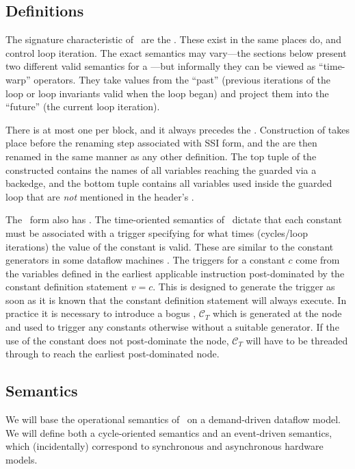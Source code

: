 \documentclass[12pt,titlepage,twoside]{article}
\newcommand{\ignore}[1]{}
\begin{document}
\subsection{Definitions}

The signature characteristic of \ssiplus\ are the .
These  exist in the same places  do, and
control loop iteration.  The exact semantics may vary---the sections
below present two different valid semantics for a ---but
informally they can be viewed as ``time-warp'' operators.  They take
values from the ``past'' (previous iterations of the loop or loop
invariants valid when the loop began) and project them into the
``future'' (the current loop iteration).

There is at most one \xifunction{} per \phifunction{} block, and it
always precedes the .  Construction of 
takes place before the renaming step associated with SSI form, and the
 are then renamed in the same manner as any other
definition.  The top tuple of the constructed \xifunction{} contains
the names of all variables reaching the guarded \phifunction{} via a
backedge, and the bottom tuple contains all variables used inside the
guarded loop that are {\em not} mentioned in the header's
\phifunction{}.

The \ssiplus\ form also has .  The
time-oriented semantics of \ssiplus\ dictate that each constant must
be associated with a trigger specifying for what times (cycles/loop
iterations) the value of the constant is valid.  These are similar to
the constant generators in some dataflow machines \cite{traub86:ttda}.
The triggers for a constant $c$ come from the variables defined in the
earliest applicable instruction post-dominated by the constant
definition statement $v=c$.  This is designed to generate the trigger
as soon as it is known that the constant definition statement will
always execute.  In practice it is necessary to introduce a bogus
, $\mathcal{C}_T$ which is generated at the
 node and used to trigger any constants otherwise without a
suitable generator.  If the use of the constant does not post-dominate
the  node, $\mathcal{C}_T$ will have to be threaded
through  to reach the earliest post-dominated node.

\ignore{I was supposed to talk about CALLs here?}

\subsection{Semantics}\label{sec:semantics}
We will base the operational semantics of \ssiplus\ on a demand-driven
dataflow model.  We will define both a cycle-oriented semantics and an
event-driven semantics, which (incidentally) correspond to synchronous
and asynchronous hardware models.
\end{document}
